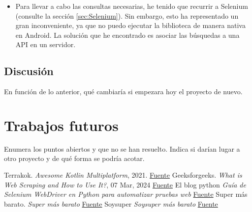 \documentclass[12pt,twoside,titlepage]{report}
\newcommand\blankpage{%
    \newpage
    \null
    \thispagestyle{empty}%
    \newpage}
\begin{document}
\begin{itemize}
\begin{itemize}
		      \item Para llevar a cabo las consultas necesarias, he tenido que recurrir a Selenium (consulte la sección \ref{sec:Selenium}). Sin embargo, esto ha representado un gran inconveniente, ya que no puedo ejecutar la biblioteca de manera nativa en Android. La solución que he encontrado es asociar las búsquedas a una API en un servidor.

	      \end{itemize}

\end{itemize}

\subsection{Discusión}

En función de lo anterior, qué cambiaría si empezara hoy el proyecto de nuevo.

\section{Trabajos futuros}

Enumera los puntos abiertos y que no se han resuelto. Indica si darían lugar a otro proyecto y de qué forma se podría acotar.

\lipsum[1-18]
\blankpage



{}

\begin{thebibliography}{99} %
	 Terrakok. \textit{Awesome Kotlin Multiplatform}, 2021. \href{https://github.com/terrakok/kmp-awesome}{Fuente}
	 Geeksforgeeks. \textit{What is Web Scraping and How to Use It?}, 07 Mar, 2024 \href{https://www.geeksforgeeks.org/what-is-web-scraping-and-how-to-use-it/}{Fuente}
	 El blog python \textit{Guía de Selenium WebDriver en Python para automatizar pruebas web} \href{https://elblogpython.com/tecnologia/guia-de-selenium-webdriver-en-python-para-automatizar-pruebas-web/}{Fuente}
	 Super más barato. \textit{Super más barato} \href{https://supermasbarato.es/}{Fuente}
	 Soysuper \textit{Soysuper más barato} \href{https://supermasbarato.es/}{Fuente}
\end{thebibliography}
\end{document}
